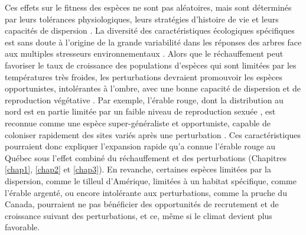 Ces effets sur le fitness des espèces ne sont pas aléatoires, mais sont
déterminés par leurs tolérances physiologiques, leurs stratégies
d'histoire de vie et leurs capacités de dispersion
\citep{aubin_traits_2016, estrada_species_2015}. La diversité des
caractéristiques écologiques spécifiques est sans doute à l'origine de
la grande variabilité dans les réponses des arbres face aux multiples
stresseurs environnementaux \citep{serra-diaz_disturbance_2015}. Alors
que le réchauffement peut favoriser le taux de croissance des
populations d'espèces qui sont limitées par les températures très
froides, les perturbations devraient promouvoir les espèces
opportunistes, intolérantes à l'ombre, avec une bonne capacité de
dispersion et de reproduction végétative \citep[Chapitre
\ref{chap3};][]{de_frenne_microclimate_2013, danneyrolles_stronger_2019}.
Par exemple, l'érable rouge, dont la distribution au nord est en partie
limitée par un faible niveau de reproduction sexuée
\citep{tremblay_potential_2002}, est reconnue comme une espèce
super-généraliste et opportuniste, capable de coloniser rapidement des
sites variés après une perturbation
\citep{abrams_red_1998, fei_rapid_2009}. Ces caractéristiques pourraient
donc expliquer l'expansion rapide qu'a connue l'érable rouge au Québec
sous l'effet combiné du réchauffement et des perturbations (Chapitres
\ref{chap1}, \ref{chap2} et \ref{chap3}). En revanche, certaines espèces
limitées par la dispersion, comme le tilleul d'Amérique, limitées à un
habitat spécifique, comme l'érable argenté, ou encore intolérante aux
perturbations, comme la pruche du Canada, pourraient ne pas bénéficier
des opportunités de recrutement et de croissance suivant des
perturbations, et ce, même si le climat devient plus favorable.

